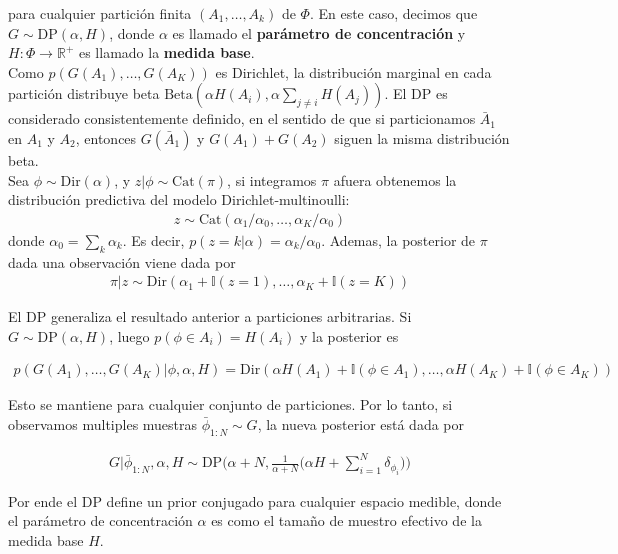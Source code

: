 \documentclass[letterpaper,12pt,oneside]{book} %
\begin{document}
para cualquier partición finita $(A_{1}, \ldots, A_{k})$ de $\Phi$. En este caso, decimos que $G\sim \text{DP}(\alpha, H)$, donde $\alpha$ es llamado el \textbf{parámetro de concentración} y $H: \Phi \rightarrow \mathbb{R}^{+}$ es llamado la \textbf{medida base}.\\

Como $p(G(A_{1}), \ldots, G(A_{K}))$ es Dirichlet, la distribución marginal en cada partición distribuye beta $\text{Beta}(\alpha H(A_{i}), \alpha \sum_{j\neq i}H(A_{j}))$. El DP es considerado consistentemente definido, en el sentido de que si particionamos $\bar{A}_{1}$ en $A_{1}$ y $A_{2}$, entonces $G(\bar{A}_{1})$ y $G(A_{1})+G(A_{2})$ siguen la misma distribución beta. \\

Sea $\phi \sim \text{Dir}(\alpha)$, y $z|\phi  \sim \text{Cat}(\pi)$, si integramos $\pi$ afuera obtenemos la distribución predictiva del modelo Dirichlet-multinoulli:
\begin{align}
    z\sim \text{Cat}(\alpha_{1}/\alpha_{0}, \ldots, \alpha_{K}/\alpha_{0})
\end{align}
donde $\alpha_{0} = \sum_{k}\alpha_{k}$. Es decir, $p(z=k|\alpha)=\alpha_{k}/\alpha_{0}$. Ademas, la posterior de $\pi$ dada una observación viene dada por
\begin{align}
    \pi|z \sim \text{Dir}(\alpha_{1}+\mathbb{I}(z=1), \ldots, \alpha_{K}+\mathbb{I}(z=K))
\end{align}

El DP generaliza el resultado anterior a particiones arbitrarias. Si $G\sim \text{DP}(\alpha, H)$, luego $p(\phi \in A_{i})=H(A_{i})$ y la posterior es

\begin{align}
    p(G(A_{1}), \ldots, G(A_{K})|\phi, \alpha, H) = \text{Dir}(\alpha H(A_{1})+\mathbb{I}(\phi \in A_{1}), \ldots, \alpha H(A_{K})+\mathbb{I}(\phi \in A_{K}))
\end{align}

Esto se mantiene para cualquier conjunto de particiones. Por lo tanto, si observamos multiples muestras $\bar{\phi}_{1:N}\sim G$, la nueva posterior está dada por 

\begin{align}
G|\bar{\phi}_{1:N}, \alpha, H \sim \text{DP}\bigg(\alpha+N, \frac{1}{\alpha+N}\bigg(\alpha H+\sum_{i=1}^{N}\delta_{\phi_{i}}\bigg)\bigg)
\end{align}

Por ende el DP define un prior conjugado para cualquier espacio medible, donde el parámetro de concentración $\alpha$ es como el tamaño de muestro efectivo de la medida base $H$.\\
\end{document}
